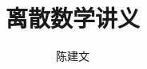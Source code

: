 \documentclass{book}[oneside]
\begin{document}
\begin{CJK*}{UTF8}{gbsn}
  \title{离散数学讲义}
  \author{陈建文}
  \maketitle
  






  \setcounter{chapter}{0}
  
\end{CJK*}
\end{document}
